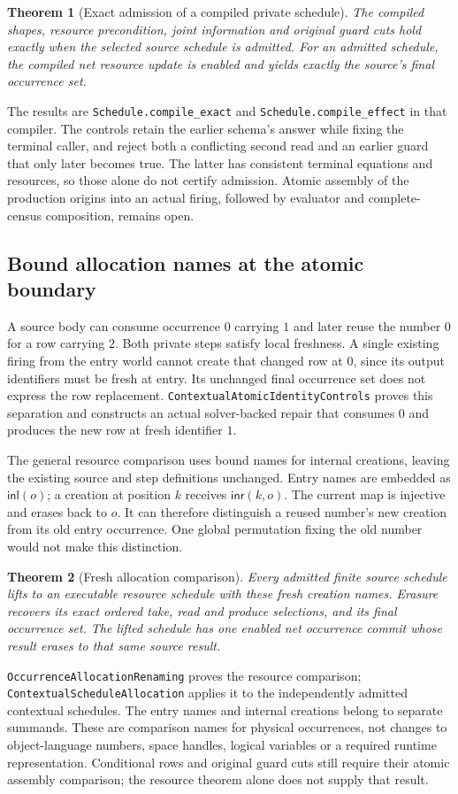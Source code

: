 \documentclass[11pt]{article}
\newtheorem{theorem}{Theorem}
\newcommand{\code}[1]{\texttt{\small #1}}
\begin{document}
\begin{theorem}[Exact admission of a compiled private schedule]
The compiled shapes, resource precondition, joint information and original
guard cuts hold exactly when the selected source schedule is admitted.
For an admitted schedule, the compiled net resource update is enabled
and yields exactly the source's final occurrence set.
\end{theorem}
The results are \code{Schedule.compile\_exact} and
\code{Schedule.compile\_effect} in that compiler. The controls retain the
earlier schema's answer while fixing the terminal caller, and reject both
a conflicting second read and an earlier guard that only later becomes
true. The latter has consistent terminal equations and resources, so those
alone do not certify admission. Atomic assembly of the production origins
into an actual firing, followed by evaluator and complete-census
composition, remains open.

\subsection{Bound allocation names at the atomic boundary}

A source body can consume occurrence $0$ carrying $1$ and later reuse
the number $0$ for a row carrying $2$. Both private steps satisfy local
freshness. A single existing firing from the entry world cannot create
that changed row at $0$, since its output identifiers must be fresh at
entry. Its unchanged final occurrence set does not express the row
replacement. \code{ContextualAtomicIdentityControls} proves this
separation and constructs an actual solver-backed repair that consumes
$0$ and produces the new row at fresh identifier $1$.

The general resource comparison uses bound names for internal creations,
leaving the existing source and step definitions unchanged. Entry names
are embedded as $\mathsf{inl}(o)$; a creation at position $k$ receives
$\mathsf{inr}(k,o)$. The current map is injective and erases back to $o$.
It can therefore distinguish a reused number's new creation from its
old entry occurrence. One global permutation fixing the old number would
not make this distinction.

\begin{theorem}[Fresh allocation comparison]
Every admitted finite source schedule lifts to an executable resource
schedule with these fresh creation names. Erasure recovers its exact
ordered take, read and produce selections, and its final occurrence set.
The lifted schedule has one enabled net occurrence commit whose result
erases to that same source result.
\end{theorem}
\code{OccurrenceAllocationRenaming} proves the resource comparison;
\code{ContextualScheduleAllocation} applies it to the independently
admitted contextual schedules. The entry names and internal creations
belong to separate summands. These are comparison names for physical
occurrences, not changes to object-language numbers, space handles,
logical variables or a required runtime representation. Conditional rows
and original guard cuts still require their atomic assembly comparison;
the resource theorem alone does not supply that result.
\end{document}
